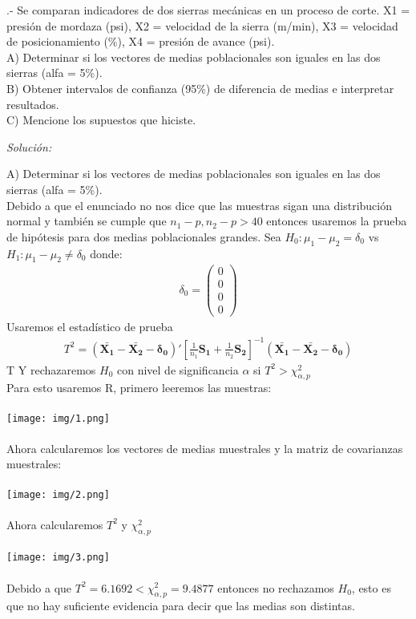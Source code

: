 \documentclass[12pt]{article}
\newenvironment{problem}[2][Problema]{\begin{trivlist}
\item[\hskip \labelsep {\bfseries #1}\hskip \labelsep {\bfseries #2.}]}{\end{trivlist}}
\newenvironment{sol}
    {\emph{Solución:}
    }
    {
    }
\begin{document}

\begin{problem}{1}
 1.- Se comparan indicadores de dos sierras mecánicas en un proceso de corte. 
X1 = presión de mordaza (psi), X2 = velocidad de la sierra (m/min), 
X3 = velocidad de posicionamiento (\%), X4 = presión de avance (psi).\\
A) Determinar si los vectores de medias poblacionales son iguales en las dos sierras (alfa = 5\%). \\
B) Obtener intervalos de confianza (95\%) de diferencia de medias e interpretar resultados.\\
C) Mencione los supuestos que hiciste.
\end{problem}
\begin{sol}
A) Determinar si los vectores de medias poblacionales son iguales en las dos sierras (alfa = 5\%). \\
Debido a que el enunciado no nos dice que las muestras sigan una distribución normal y también se cumple que $n_1-p,n_2-p>40$ entonces usaremos la prueba de hipótesis para dos medias poblacionales grandes.
Sea $H_0:\mu_1-\mu_2 = \delta_0$ vs $H_1: \mu_1 - \mu_2
\neq \delta_0$ donde:
\begin{align*}
\delta_0 = \begin{pmatrix}
0\\0\\0\\0
\end{pmatrix}
\end{align*}
Usaremos el estadístico de prueba
\begin{align*}
T^2 = (\bm{\bar{X_1}-\bar{X_2}-\delta_0})' \left[ \frac{1}{n_1}\bm{S_1}+\frac{1}{n_2}\bm{S_2} \right] ^{-1} (\bm{\bar{X_1}-\bar{X_2}-\delta_0})
\end{align*}T
Y rechazaremos $H_0$ con nivel de significancia $\alpha$ si $T^2 > \chi_{\alpha, p}^2$\\
Para esto usaremos R, primero leeremos las muestras:\\\\
\texttt{[image: img/1.png]}\\\\
Ahora calcularemos los vectores de medias muestrales y la matriz de covarianzas muestrales:\\\\
\texttt{[image: img/2.png]}\\\\
Ahora calcularemos $T^2$ y $\chi_{\alpha, p}^2$ \\\\
\texttt{[image: img/3.png]}\\\\
Debido a que $T^2=6.1692 < \chi_{\alpha, p}^2=9.4877$ entonces no rechazamos $H_0$, esto es que no hay suficiente evidencia para decir que las medias son distintas. 


\end{sol}
\end{document}
